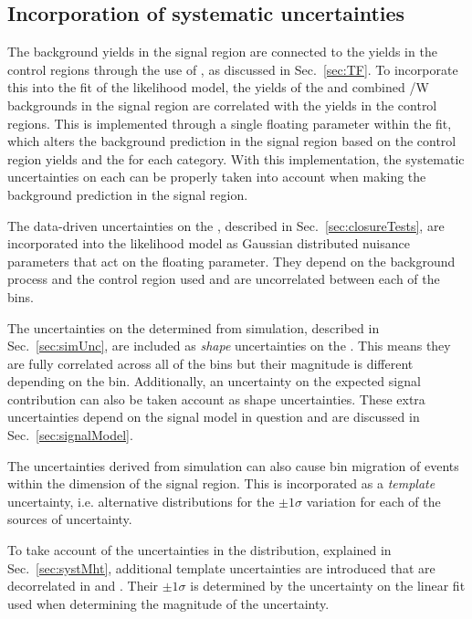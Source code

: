 \subsection{Incorporation of systematic uncertainties}

The background yields in the signal region are connected to the yields
in the control regions through the use of \TFs, as discussed in
Sec.~\ref{sec:TF}. To incorporate this into the fit of the likelihood
model, the yields of the \znunu and combined \ttbar/W backgrounds in
the signal region are correlated with the yields in the control
regions. This is implemented through a single floating parameter
within the fit, which alters the background prediction in the signal
region based on the control region yields and the \TF for each
category. With this implementation, the systematic uncertainties on
each \TF can be properly taken into account when making the background
prediction in the signal region. 

The data-driven uncertainties on the \TFs, described in
Sec.~\ref{sec:closureTests}, are incorporated into the likelihood
model as Gaussian distributed nuisance parameters that act on the
floating parameter. They depend on the background process and the
control region used and are uncorrelated between each of the \htcat
bins.

The uncertainties on the \TFs determined from simulation, described in
Sec.~\ref{sec:simUnc}, are included as \emph{shape} uncertainties on
the \TFs. This means they are fully correlated across all of the
\htcat bins but their magnitude is different depending on the bin. 
Additionally, an uncertainty on the expected signal contribution can
also be taken account as shape uncertainties. These extra
uncertainties depend on the signal model in question and are discussed
in Sec.~\ref{sec:signalModel}.

The uncertainties derived from simulation can also cause bin migration
of events within the \MHT dimension of the signal region. This is
incorporated as a \emph{template} uncertainty, i.e. alternative \MHT
distributions for the $\pm1\sigma$ variation for each of the sources
of uncertainty. 

To take account of the uncertainties in the \MHT
distribution, explained in Sec.~\ref{sec:systMht}, additional template
uncertainties are introduced that are decorrelated in \nj and \HT.
Their $\pm1\sigma$ is determined by the uncertainty on the linear fit
used when determining the magnitude of the \MHT uncertainty.

